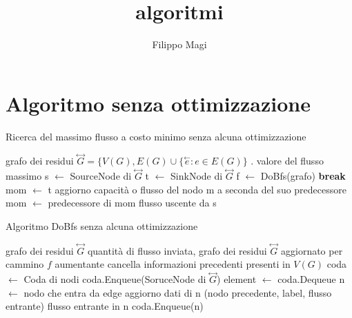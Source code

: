 \documentclass{article}
\title{algoritmi}
\author{Filippo Magi }
\begin{document}
\maketitle

\section{Algoritmo senza ottimizzazione}

\begin{algorithm}
\caption{Ricerca del massimo flusso a costo minimo senza alcuna ottimizzazione}
\begin{algorithmic}
\REQUIRE grafo dei residui $\overset{\leftrightarrow}{G} = \{V(G),E(G) \cup \{ \overset{\leftarrow}{e} : e \in E(G) \}$ .
\ENSURE valore del flusso massimo
\STATE s $\leftarrow$ SourceNode di  $\overset{\leftrightarrow}{G}$
\STATE t $\leftarrow$ SinkNode di  $\overset{\leftrightarrow}{G}$
\LOOP
\STATE f $\leftarrow$ DoBfs(grafo)
\STATE \textbf{break}
\ENDIF
\STATE mom $\leftarrow$ t
\STATE aggiorno capacità o flusso del nodo m a seconda del suo predecessore
\STATE mom $\leftarrow$ predecessore di mom
\ENDWHILE
\ENDLOOP
\RETURN flusso uscente da s

\end{algorithmic}
\end{algorithm}

\begin{algorithm}
\caption{Algoritmo DoBfs senza alcuna ottimizzazione}
\begin{algorithmic}
\REQUIRE grafo dei residui $\overset{\leftrightarrow}{G}$
\ENSURE quantità di flusso inviata, grafo dei residui $\overset{\leftrightarrow}{G}$ aggiornato per cammino $f$ aumentante
\STATE cancella informazioni precedenti presenti in $V(G)$
\STATE coda $\leftarrow$ Coda di nodi
\STATE coda.Enqueue(SoruceNode di $\overset{\leftrightarrow}{G}$)
\STATE element $\leftarrow$ coda.Dequeue
\STATE n $\leftarrow$ nodo che entra da edge
\STATE aggiorno dati di n (nodo precedente, label, flusso entrante)
\RETURN flusso entrante in n
\ELSE
\STATE coda.Enqueue(n)
\ENDIF
\ENDIF
\ENDFOR
\ENDWHILE
{}
\end{algorithmic}
\end{algorithm}
\end{document}
